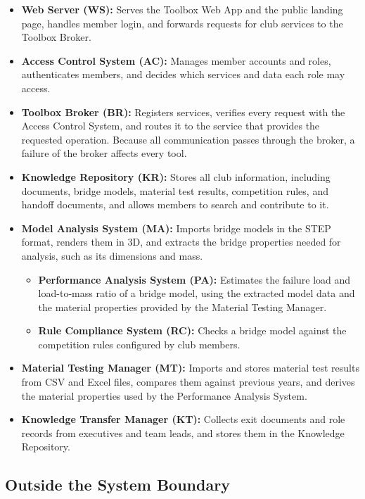 \documentclass{article}
\begin{document}
\begin{itemize}
    \item \textbf{Web Server (WS):} Serves the Toolbox Web App and the public
    landing page, handles member login, and forwards requests for club services
    to the Toolbox Broker.
    \item \textbf{Access Control System (AC):} Manages member accounts and
    roles, authenticates members, and decides which services and data each role
    may access.
    \item \textbf{Toolbox Broker (BR):} Registers services, verifies every
    request with the Access Control System, and routes it to the service that
    provides the requested operation. Because all communication passes through
    the broker, a failure of the broker affects every tool.
    \item \textbf{Knowledge Repository (KR):} Stores all club information,
    including documents, bridge models, material test results, competition
    rules, and handoff documents, and allows members to search and contribute to it.
    \item \textbf{Model Analysis System (MA):} Imports bridge models in the STEP
    format, renders them in 3D, and extracts the bridge properties needed for
    analysis, such as its dimensions and mass.
    \begin{itemize}
        \item \textbf{Performance Analysis System (PA):} Estimates the failure
        load and load-to-mass ratio of a bridge model, using the extracted model
        data and the material properties provided by the Material Testing
        Manager.
        \item \textbf{Rule Compliance System (RC):} Checks a bridge model against
        the competition rules configured by club members.
    \end{itemize}
    \item \textbf{Material Testing Manager (MT):} Imports and stores material
    test results from CSV and Excel files, compares them against previous years,
    and derives the material properties used by the Performance Analysis System.
    \item \textbf{Knowledge Transfer Manager (KT):} Collects exit documents and
    role records from executives and team leads, and stores them in the
    Knowledge Repository.
\end{itemize}

\subsection{Outside the System Boundary}
\end{document}
